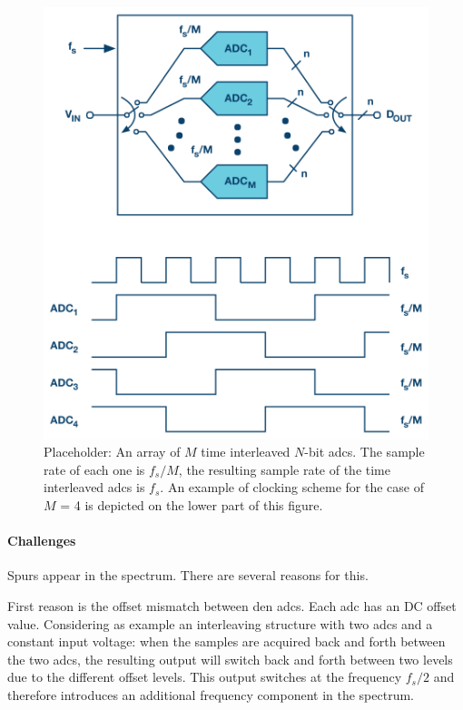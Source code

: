 \begin{figure}[tbh]
	\centering
	\includegraphics[width = \textwidth]{chap/02-theory/img/adc_inter}
	\caption[Time Interleaving]{Placeholder: An array of $M$ time interleaved $N$-bit \glspl{adc}. The sample rate of each one is $f_s/M$, the resulting sample rate of the time interleaved \glspl{adc} is $f_s$. An example of clocking scheme for the case of $M$ = 4 is depicted on the lower part of this figure. \cite{mangrob}}
	\label{fig:adc_interleaving}
\end{figure}

\paragraph{Challenges}
Spurs appear in the spectrum. There are several reasons for this.

First reason is the offset mismatch between den \glspl{adc}. Each \gls{adc} has an DC offset value. Considering as example an interleaving structure with two \glspl{adc} and a constant input voltage: when the samples are acquired back and forth between the two \glspl{adc}, the resulting output will switch back and forth between two levels due to the different offset levels. This output switches at the frequency $f_s/2$ and therefore introduces an additional frequency component in the spectrum.

